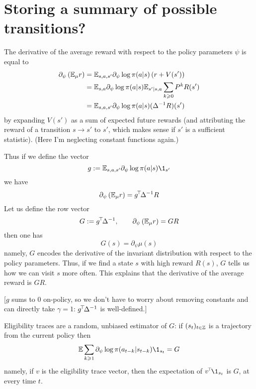 \documentclass[11pt,a4paper]{article}
\begin{document}
\section{Storing a summary of possible transitions?}

The derivative of the average reward with respect to the policy
parameters $\psi$ is equal to
\begin{align}
\partial_\psi \left(\mathbb{E}_\mu r\right)&=
\mathbb{E}_{s,a,s'} \partial_\psi \log \pi(a|s)\left(
r+V(s')
\right)
\\&=\mathbb{E}_{s,a}\partial_\psi \log \pi(a|s)\mathbb{E}_{s'|s,a}\sum_{k\geqslant 0}P^k R(s')
\\&=\mathbb{E}_{s,a,s'}\partial_\psi \log \pi(a|s)(\Delta^{-1}R)(s')
\end{align}
by expanding $V(s')$ as a sum of expected future rewards (and attributing
the reward of a transition $s\to s'$ to $s'$, which makes sense if $s'$
is a sufficient statistic).
(Here I'm neglecting constant functions again.)

Thus if we define the vector
\begin{equation}
g\deq \E_{s,a,s'}\partial_\psi \log \pi(a|s)\1_{s'}
\end{equation}
we have
\begin{equation}
\partial_\psi \left(\mathbb{E}_\mu r\right)=g^{\!\top}\!\Delta^{-1}R
\end{equation}
Let us define the row vector
\begin{equation}
G\mathrel{\mathop{:}}= g^{\!\top}\!\Delta^{-1},\qquad \partial_\psi \left(\mathbb{E}_\mu
r\right)=GR
\end{equation}
then one has
\begin{equation}
G(s)=\partial_\psi \mu(s)
\end{equation}
namely, $G$ encodes the derivative of the invariant distribution with
respect to the policy parameters. Thus, if we find a state $s$ with high
reward $R(s)$, $G$ tells us how we can visit $s$ more often. This
explains that the derivative of the average reward is $GR$.

[$g$ sums to $0$ on-policy, so we don't have to worry about removing
constants and can directly take $\gamma=1$: $g^{\!\top}\!\Delta^{-1}$ is
well-defined.]

Eligibility traces are a random, unbiased estimator of $G$: if
$(s_t)_{t\in {\mathbb{Z}}}$ is a
trajectory from the current policy then
\begin{equation}
\E\sum_{k\geq 1}\partial_\psi \log \pi(a_{t-k}|s_{t-k})\1_{s_t}=G
\end{equation}
namely, if $v$ is the eligibility trace vector, then the expectation of
$\transp{v}\1_{s_t}$ is $G$, at every time $t$.
\end{document}
